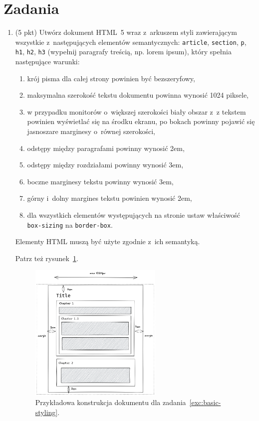 \documentclass[12pt]{article}
\begin{document}
    \section*{Zadania}
    \begin{enumerate}
        \item\label{exc:basic-styling}
            (5 pkt) Utwórz dokument HTML~5 wraz z~arkuszem styli zawierającym wszystkie z~następujących elementów semantycznych: \texttt{article}, \texttt{section}, \texttt{p}, \texttt{h1}, \texttt{h2}, \texttt{h3} (wypełnij paragrafy treścią, np. lorem ipsum), który spełnia następujące warunki:
            \begin{enumerate}
                \item krój pisma dla całej strony powinien być bezszeryfowy,
                \item maksymalna szerokość tekstu dokumentu powinna wynosić 1024 piksele,
                \item w przypadku monitorów o~większej szerokości biały obszar z~z tekstem powinien wyświetlać się na środku ekranu, po bokach powinny pojawić się jasnoszare marginesy o~równej szerokości,
                \item odstępy między paragrafami powinny wynosić 2em,
                \item odstępy między rozdziałami powinny wynosić 3em,
                \item boczne marginesy tekstu powinny wynosić 3em,
                \item górny i~dolny margines tekstu powinien wynosić 2em,
                \item dla wszystkich elementów występujących na stronie ustaw właściwość \texttt{box-sizing} na \texttt{border-box}.
            \end{enumerate}

            Elementy HTML muszą być użyte zgodnie z~ich semantyką.

            Patrz też rysunek~\ref{fig:basic-styling}.

            \begin{figure}[p]
                \centering
                \includegraphics[width=0.6\textwidth]{lista-1-1}
                \caption{Przykładowa konstrukcja dokumentu dla zadania~\ref{exc:basic-styling}.}
                \label{fig:basic-styling}
            \end{figure}


\end{enumerate}
\end{document}
